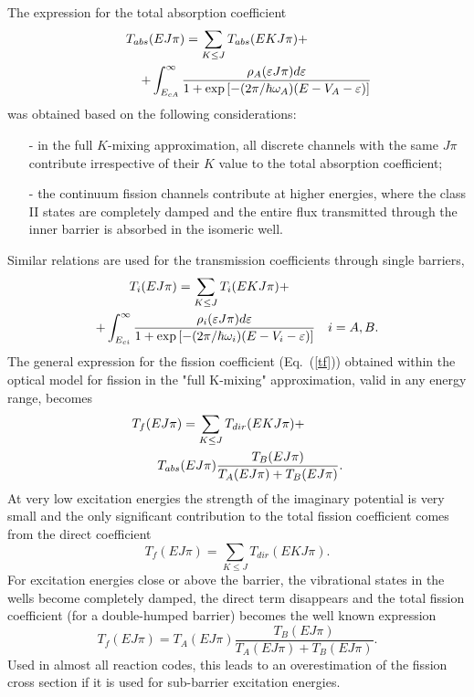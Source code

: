 The expression for the total absorption coefficient
\begin{eqnarray}
T_{abs}(EJ\pi)=\sum_{K\le J}T_{abs}(EKJ\pi) +\qquad\qquad\quad  \notag \\
\quad\qquad + \int_{E_{cA}}^{\infty} \frac {\rho_{A}(\varepsilon
J\pi)d\varepsilon} {1+\exp\left[ -(2\pi/\hbar\omega_{A})
(E-V_{A}-\varepsilon)\right] }  \label{tabst}
\end{eqnarray}
was obtained based on the following considerations:

\begin{itemize}
\item[-] in the full $K$-mixing approximation, all discrete channels with the
same $J\pi$ contribute irrespective of their $K$ value to the total
absorption coefficient;

\item[-] the continuum fission channels contribute at higher energies, where
the class II states are completely damped and the entire flux transmitted
through the inner barrier is absorbed in the isomeric well.
\end{itemize}

Similar relations are used for the transmission coefficients through single
barriers,
\begin{eqnarray}
T_{i}(EJ\pi)=\sum_{K\le J}T_{i}(EKJ\pi) +\qquad\qquad\qquad\quad  \notag \\
+ \int_{E_{ci}}^{\infty} \frac {\rho_{i}(\varepsilon J\pi)d\varepsilon} {%
1+\exp\left[ -({2\pi}/\hbar\omega_{i}) (E-V_{i}-\varepsilon)\right] } \quad
i=A,B.  \label{tfi}
\end{eqnarray}
The general expression for the fission coefficient (Eq.~(\ref{tf})) obtained
within the optical model for fission in the "full K-mixing" approximation, valid
in any energy range, becomes
\begin{eqnarray}
T_{f}(EJ\pi)=\sum_{K\le J}T_{dir}(EKJ\pi)+\qquad\quad  \notag \\
T_{abs}(E J \pi)\frac{T_{B}(E J \pi)}{T_{A}(E J \pi)+T_{B}(E J \pi)}.
\label{tfis}
\end{eqnarray}
At very low excitation energies the strength of the imaginary potential is
very small and the only significant contribution to the total fission
coefficient comes from the direct coefficient
\begin{equation}
T_{f}(EJ\pi)=\sum_{K\le J}T_{dir}(EKJ\pi).  \label{tf-zero}
\end{equation}
For excitation energies close or above the barrier, the vibrational states
in the wells become completely damped, the direct term disappears and the
total fission coefficient (for a double-humped barrier) becomes the well
known expression
\begin{equation}
T_{f}(E J \pi)=T_{A}(E J \pi)\frac{T_{B}(E J \pi)}{T_{A}(E J \pi)+T_{B}(E J
\pi)}.  \label{tf-full}
\end{equation}
Used in almost all reaction codes, this leads to an
overestimation of the fission cross section if it is used for sub-barrier
excitation energies.

